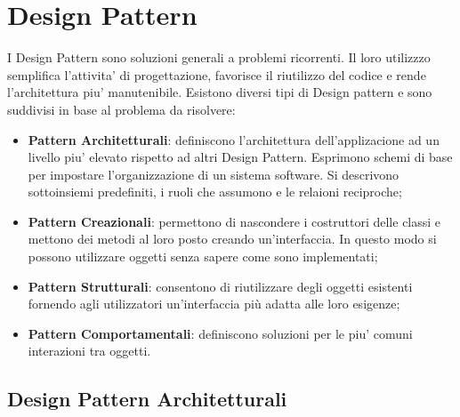\section{Design Pattern}
	I Design Pattern sono soluzioni generali a problemi ricorrenti. Il loro utilizzzo semplifica l'attivita' di progettazione, favorisce il riutilizzo del codice e rende l'architettura piu' manutenibile. Esistono diversi tipi di Design pattern e sono suddivisi in base al problema da risolvere:
	\begin{itemize}\itemsep1pt
		\item \textbf{Pattern Architetturali}: definiscono l'architettura dell'applizacione ad un livello piu' elevato rispetto ad altri Design Pattern. Esprimono schemi di base per impostare l'organizzazione di un sistema software. Si descrivono sottoinsiemi predefiniti, i ruoli che assumono e le relaioni reciproche; 
		\item \textbf{Pattern Creazionali}: permettono di nascondere i costruttori delle classi e mettono dei metodi al loro posto creando un'interfaccia. In questo modo si possono utilizzare oggetti senza sapere come sono implementati;
		\item \textbf{Pattern Strutturali}: consentono di riutilizzare degli oggetti esistenti fornendo agli utilizzatori un'interfaccia più adatta alle loro esigenze;
		\item \textbf{Pattern Comportamentali}: definiscono soluzioni per le piu' comuni interazioni tra oggetti.
	\end{itemize} 
	
	\subsection{Design Pattern Architetturali}
